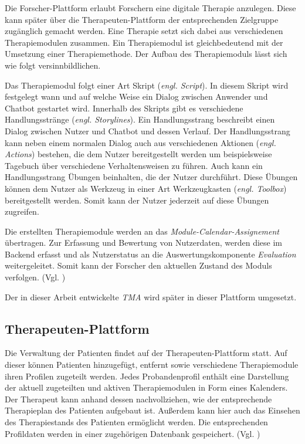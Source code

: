 Die Forscher-Plattform erlaubt Forschern eine digitale Therapie anzulegen. Diese kann später über die Therapeuten-Plattform der entsprechenden Zielgruppe zugänglich gemacht werden. Eine Therapie setzt sich dabei aus verschiedenen Therapiemodulen zusammen. Ein Therapiemodul ist gleichbedeutend mit der Umsetzung einer Therapiemethode. Der Aufbau des Therapiemoduls lässt sich wie folgt versinnbildlichen.

Das Therapiemodul folgt einer Art Skript (\emph{engl. Script}). In diesem Skript wird festgelegt wann und auf welche Weise ein Dialog zwischen Anwender und Chatbot gestartet wird. Innerhalb des Skripts gibt es verschiedene Handlungsstränge (\emph{engl. Storylines}). Ein Handlungsstrang beschreibt einen Dialog zwischen Nutzer und Chatbot und dessen Verlauf. Der Handlungsstrang kann neben einem normalen Dialog auch aus verschiedenen Aktionen (\emph{engl. Actions}) bestehen, die dem Nutzer bereitgestellt werden um beispielsweise Tagebuch über verschiedene Verhaltensweisen zu führen. Auch kann ein Handlungsstrang Übungen beinhalten, die der Nutzer durchführt. Diese Übungen können dem Nutzer als Werkzeug in einer Art Werkzeugkasten (\emph{engl. Toolbox}) bereitgestellt werden. Somit kann der Nutzer jederzeit auf diese Übungen zugreifen.

Die erstellten Therapiemodule werden an das \emph{Module-Calendar-Assignement} übertragen. Zur Erfassung und Bewertung von Nutzerdaten, werden diese im Backend erfasst und als Nutzerstatus an die Auswertungskomponente \emph{Evaluation} weitergeleitet. Somit kann der Forscher den aktuellen Zustand des Moduls verfolgen. (Vgl. \cite[51\psq]{ben})

Der in dieser Arbeit entwickelte \emph{TMA} wird später in dieser Plattform umgesetzt.  


\subsection{Therapeuten-Plattform}
Die Verwaltung der Patienten findet auf der Therapeuten-Plattform statt. Auf dieser können Patienten hinzugefügt, entfernt sowie verschiedene Therapiemodule ihren Profilen zugeteilt werden. Jedes Probandenprofil enthält eine Darstellung der aktuell zugeteilten und aktiven Therapiemodulen in Form eines Kalenders. Der Therapeut kann anhand dessen nachvollziehen, wie der entsprechende Therapieplan des Patienten aufgebaut ist. Außerdem kann hier auch das Einsehen des Therapiestands des Patienten ermöglicht werden. Die entsprechenden Profildaten werden in einer zugehörigen Datenbank gespeichert. (Vgl. \cite[51\psq]{ben})


